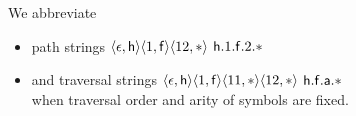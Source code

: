 
\begin{notation}
	We abbreviate
	\begin{itemize}
		\pause
		\item path strings
		$\langle\epsilon,{\mathsf h}\rangle\langle1,{\mathsf f}\rangle\langle12,*\rangle$
		\hfill ${\mathsf h}.1.{\mathsf f}.2.{*}$
		\pause
		\item and traversal strings
		$\langle\epsilon,{\mathsf h}\rangle\langle1,{\mathsf f}\rangle\langle11,*\rangle\langle12,*\rangle$
		\hfill ${\mathsf h}.{\mathsf f}.{\mathsf a}.{*}$
		\pause\\
		when traversal order and arity of symbols are fixed.
	\end{itemize}
\end{notation}